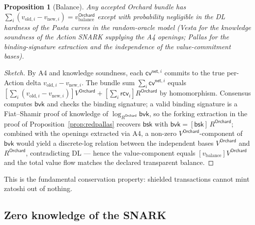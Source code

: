 \documentclass[11pt,a4paper]{article}
\newtheorem{proposition}[theorem]{Proposition}
\theoremstyle{definition}
\newcommand{\cvsym}{\mathsf{cv}}
\newcommand{\rcv}{\ensuremath{\mathsf{rcv}}}
\begin{document}
\begin{proposition}[Balance]\label{prop:balance}
Any accepted Orchard bundle has
$\sum_i (v_{\mathrm{old}, i} - v_{\mathrm{new}, i}) = v_{\mathrm{balance}}^{\mathsf{Orchard}}$
except with probability negligible in the DL hardness of the Pasta
curves in the random-oracle model (Vesta for the knowledge soundness of
the Action SNARK supplying the A4 openings; Pallas for the
binding-signature extraction and the independence of the
value-commitment bases).
\end{proposition}

\begin{proof}[Sketch]
By A4 and knowledge soundness, each $\cvsym^{\mathsf{net}, i}$ commits
to the true per-Action delta $v_{\mathrm{old}, i} - v_{\mathrm{new}, i}$.
The bundle sum $\sum_i \cvsym^{\mathsf{net}, i}$ equals $[\sum_i (v_{\mathrm{old}, i} - v_{\mathrm{new}, i})] V^{\mathsf{Orchard}} + [\sum_i \rcv_i] R^{\mathsf{Orchard}}$
by homomorphism. Consensus computes $\mathsf{bvk}$ and checks the
binding signature; a valid binding signature is a Fiat--Shamir proof of
knowledge of $\log_{R^{\mathsf{Orchard}}} \mathsf{bvk}$, so the forking
extraction in the proof of Proposition~\ref{prop:redpallas} recovers
$\mathsf{bsk}$ with $\mathsf{bvk} = [\mathsf{bsk}]\, R^{\mathsf{Orchard}}$;
combined with the openings extracted via A4, a non-zero
$V^{\mathsf{Orchard}}$-component of $\mathsf{bvk}$ would yield a
discrete-log relation between the independent bases $V^{\mathsf{Orchard}}$
and $R^{\mathsf{Orchard}}$, contradicting DL --- hence the value-component
equals $[v_{\mathrm{balance}}] V^{\mathsf{Orchard}}$ and the total value
flow matches the declared transparent balance.
\end{proof}

This is the fundamental conservation property: shielded transactions
cannot mint zatoshi out of nothing.

\subsection{Zero knowledge of the SNARK}\label{sec:halo-zk}
\end{document}
